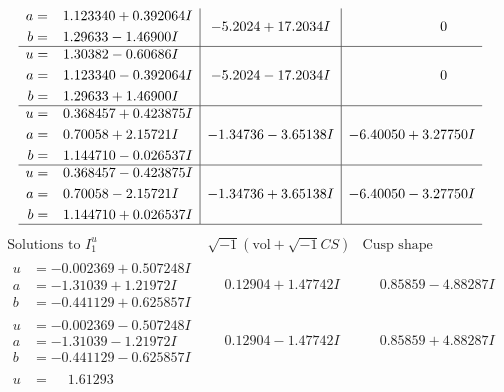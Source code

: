 \documentclass[1p]{elsarticle_modified}
\theoremstyle{definition}
\newcommand{\I}{\sqrt{-1}}
\begin{document}
$$\begin{array}{c|c|c}
\begin{aligned}
a &= \phantom{-}1.123340 + 0.392064 I \\
b &= \phantom{-}1.29633 - 1.46900 I\end{aligned}
 & -5.2024 + 17.2034 I & \phantom{-0.000000 } 0 \\ \hline\begin{aligned}
u &= \phantom{-}1.30382 - 0.60686 I \\
a &= \phantom{-}1.123340 - 0.392064 I \\
b &= \phantom{-}1.29633 + 1.46900 I\end{aligned}
 & -5.2024 - 17.2034 I & \phantom{-0.000000 } 0 \\ \hline\begin{aligned}
u &= \phantom{-}0.368457 + 0.423875 I \\
a &= \phantom{-}0.70058 + 2.15721 I \\
b &= \phantom{-}1.144710 - 0.026537 I\end{aligned}
 & -1.34736 - 3.65138 I & -6.40050 + 3.27750 I \\ \hline\begin{aligned}
u &= \phantom{-}0.368457 - 0.423875 I \\
a &= \phantom{-}0.70058 - 2.15721 I \\
b &= \phantom{-}1.144710 + 0.026537 I\end{aligned}
 & -1.34736 + 3.65138 I & -6.40050 - 3.27750 I\\
 \hline 
 \end{array}$$\newpage$$\begin{array}{c|c|c}  
\text{Solutions to }I^u_{1}& \I (\text{vol} + \sqrt{-1}CS) & \text{Cusp shape}\\
 \hline 
\begin{aligned}
u &= -0.002369 + 0.507248 I \\
a &= -1.31039 + 1.21972 I \\
b &= -0.441129 + 0.625857 I\end{aligned}
 & \phantom{-}0.12904 + 1.47742 I & \phantom{-}0.85859 - 4.88287 I \\ \hline\begin{aligned}
u &= -0.002369 - 0.507248 I \\
a &= -1.31039 - 1.21972 I \\
b &= -0.441129 - 0.625857 I\end{aligned}
 & \phantom{-}0.12904 - 1.47742 I & \phantom{-}0.85859 + 4.88287 I \\ \hline\begin{aligned}
u &= \phantom{-}1.61293\phantom{ +0.000000I} \\

\end{aligned}
\end{array}$$
\end{document}
